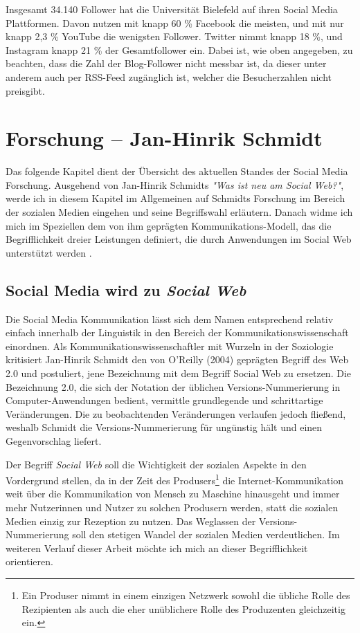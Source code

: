Insgesamt 34.140 Follower hat die Universität Bielefeld auf ihren Social Media Plattformen. Davon nutzen mit knapp 60 \% Facebook die meisten, und mit nur knapp 2,3 \% YouTube die wenigsten Follower. Twitter nimmt knapp 18 \%, und Instagram knapp 21 \% der Gesamtfollower ein. Dabei ist, wie oben angegeben, zu beachten, dass die Zahl der Blog-Follower nicht messbar ist, da dieser unter anderem auch per RSS-Feed zugänglich ist, welcher die Besucherzahlen nicht preisgibt.

\section{Forschung -- Jan-Hinrik Schmidt}
\label{sec:aktuelleforschung}

Das folgende Kapitel dient der Übersicht des aktuellen Standes der Social Media Forschung. Ausgehend von Jan-Hinrik Schmidts \textit{"Was ist neu am Social Web?"}, werde ich in diesem Kapitel im Allgemeinen auf Schmidts Forschung im Bereich der sozialen Medien eingehen und seine Begriffswahl erläutern. Danach widme ich mich im Speziellen dem von ihm geprägten Kommunikations-Modell, das die Begrifflichkeit dreier Leistungen definiert, die durch Anwendungen im Social Web unterstützt werden \cite{schmidt2008neu}.

\subsection{Social Media wird zu \textit{Social Web}}

Die Social Media Kommunikation lässt sich dem Namen entsprechend relativ einfach innerhalb der Linguistik in den Bereich der Kommunikationswissenschaft einordnen. Als Kommunikationswissenschaftler mit Wurzeln in der Soziologie kritisiert Jan-Hinrik Schmidt den von O'Reilly (2004) geprägten Begriff des Web 2.0 und postuliert, jene Bezeichnung mit dem Begriff Social Web zu ersetzen. Die Bezeichnung 2.0, die sich der Notation der üblichen Versions-Nummerierung in Computer-Anwendungen bedient, vermittle grundlegende und schrittartige Veränderungen. Die zu beobachtenden Veränderungen verlaufen jedoch fließend, weshalb Schmidt die Versions-Nummerierung für ungünstig hält und einen Gegenvorschlag liefert.

Der Begriff \textit{Social Web} soll die Wichtigkeit der sozialen Aspekte in den Vordergrund stellen, da in der Zeit des Produsers\footnote{Ein Produser nimmt in einem einzigen Netzwerk sowohl die übliche Rolle des Rezipienten als auch die eher unüblichere Rolle des Produzenten gleichzeitig ein.} die Internet-Kommunikation weit über die Kommunikation von Mensch zu Maschine hinausgeht und immer mehr Nutzerinnen und Nutzer zu solchen Produsern werden, statt die sozialen Medien einzig zur Rezeption zu nutzen. Das Weglassen der Versions-Nummerierung soll den stetigen Wandel der sozialen Medien verdeutlichen. Im weiteren Verlauf dieser Arbeit möchte ich mich an dieser Begrifflichkeit orientieren.

